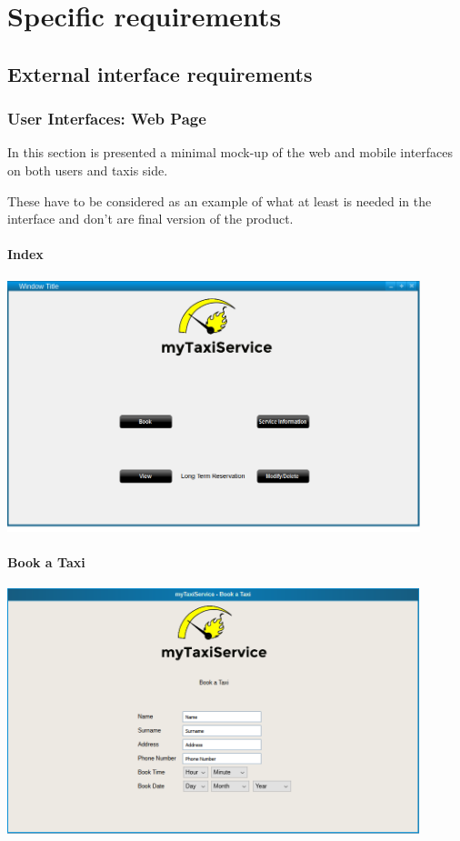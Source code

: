 \section{Specific requirements}
	\subsection{External interface requirements}
		\subsubsection{User Interfaces: Web Page}
		In this section is presented a minimal mock-up of the web and mobile interfaces on both users and taxis side. 
		
		These have to be considered as an example of what at least is needed in the interface and don't are final version of the product.
		\paragraph{Index}
		\begin{center}
			\includegraphics[width=0.90\textwidth]{./images/index}
		\end{center}
		\paragraph{Book a Taxi}
		\begin{center}
			\includegraphics[width=0.90\textwidth]{./images/check_reservation}
		\end{center}
